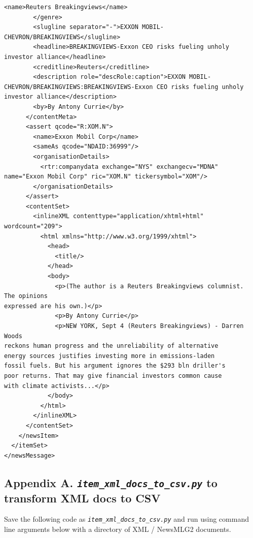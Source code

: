 \documentclass[11pt]{article}
\begin{document}
\begin{lstlisting}[basicstyle=\tiny]
          <name>Reuters Breakingviews</name>
        </genre>
        <slugline separator="-">EXXON MOBIL-CHEVRON/BREAKINGVIEWS</slugline>
        <headline>BREAKINGVIEWS-Exxon CEO risks fueling unholy investor alliance</headline>
        <creditline>Reuters</creditline>
        <description role="descRole:caption">EXXON MOBIL-CHEVRON/BREAKINGVIEWS:BREAKINGVIEWS-Exxon CEO risks fueling unholy investor alliance</description>
        <by>By Antony Currie</by>
      </contentMeta>
      <assert qcode="R:XOM.N">
        <name>Exxon Mobil Corp</name>
        <sameAs qcode="NDAID:36999"/>
        <organisationDetails>
          <rtr:companydata exchange="NYS" exchangecv="MDNA" name="Exxon Mobil Corp" ric="XOM.N" tickersymbol="XOM"/>
        </organisationDetails>
      </assert>
      <contentSet>
        <inlineXML contenttype="application/xhtml+html" wordcount="209">
          <html xmlns="http://www.w3.org/1999/xhtml">
            <head>
              <title/>
            </head>
            <body>
              <p>(The author is a Reuters Breakingviews columnist.  The opinions
expressed are his own.)</p>
              <p>By Antony Currie</p>
              <p>NEW YORK, Sept 4 (Reuters Breakingviews) - Darren Woods
reckons human progress and the unreliability of alternative
energy sources justifies investing more in emissions-laden
fossil fuels. But his argument ignores the $293 bln driller's
poor returns. That may give financial investors common cause
with climate activists...</p>
            </body>
          </html>
        </inlineXML>
      </contentSet>
    </newsItem>
  </itemSet>
</newsMessage>
\end{lstlisting}
\newpage

\subsection{Appendix A. \textit{\lstinline{item_xml_docs_to_csv.py}} to transform XML docs to CSV}
\label{sec:AppendixA}
Save the following code as \textit{\lstinline{item_xml_docs_to_csv.py}} and run using command line arguments below with a directory of XML / NewsMLG2 documents.
\\
\end{document}
